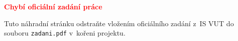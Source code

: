 \begingroup
\normalfont\rmfamily\normalsize\RaggedRight
\setlength{\parindent}{0pt}

\vspace*{0.2\textheight}
\begin{center}
  {\Large\bfseries\textcolor{RED}{Chybí oficiální zadání práce}\par}
  \bigskip
  Tuto náhradní stránku odstraňte vložením oficiálního zadání z~IS VUT
  do souboru \texttt{zadani.pdf} v~kořeni projektu.
\end{center}
\endgroup
